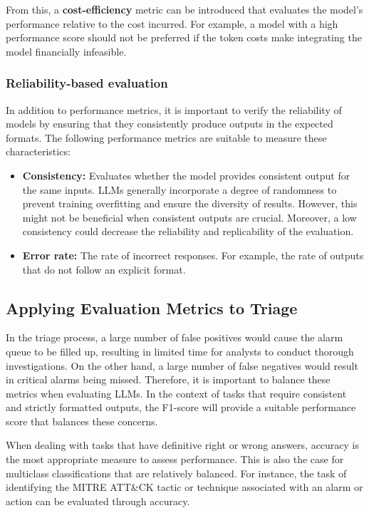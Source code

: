 From this, a \textbf{cost-efficiency} metric can be introduced that evaluates the model's performance relative to the
cost incurred.
For example, a model with a high performance score should not be preferred if the token costs make integrating the model
financially infeasible.

\subsubsection{Reliability-based evaluation}

In addition to performance metrics, it is important to verify the reliability of models by ensuring that they
consistently produce outputs in the expected formats.
The following performance metrics are suitable to measure these characteristics:
\begin{itemize}
    \item \textbf{Consistency:} Evaluates whether the model provides consistent output for the same inputs.
    LLMs generally incorporate a degree of randomness to prevent training overfitting and ensure the diversity of
    results.
    However, this might not be beneficial when consistent outputs are crucial.
    Moreover, a low consistency could decrease the reliability and replicability of the evaluation.
    \item \textbf{Error rate:} The rate of incorrect responses.
    For example, the rate of outputs that do not follow an explicit format.
\end{itemize}

\subsection{Applying Evaluation Metrics to Triage}
\label{subsec:rq2-evaluating-triage}

In the triage process, a large number of false positives would cause the alarm queue to be filled up, resulting in
limited time for analysts to conduct thorough investigations.
On the other hand, a large number of false negatives would result in critical alarms being missed.
Therefore, it is important to balance these metrics when evaluating LLMs.
In the context of tasks that require consistent and strictly formatted outputs, the F1-score will provide a suitable
performance score that balances these concerns.

When dealing with tasks that have definitive right or wrong answers, accuracy is the most appropriate measure to assess
performance.
This is also the case for multiclass classifications that are relatively balanced.
For instance, the task of identifying the MITRE ATT\&CK tactic or technique associated with an alarm or action can be
evaluated through accuracy.

